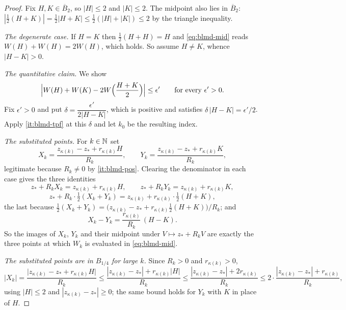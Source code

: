 \begin{proof}
Fix $H,K\in\overline B_2$, so $|H|\le2$ and $|K|\le2$. The midpoint also lies
in $\overline B_2$: $|\tfrac12(H+K)|=\tfrac12|H+K|\le\tfrac12(|H|+|K|)\le2$ by
the triangle inequality.

\emph{The degenerate case.} If $H=K$ then $\tfrac12(H+H)=H$ and
\eqref{eq:blmd-mid} reads $W(H)+W(H)=2W(H)$, which holds. So assume $H\ne K$,
whence $|H-K|>0$.

\emph{The quantitative claim.} We show
\begin{equation}\label{eq:blmd-bound}
  \Bigl|W(H)+W(K)-2W\Bigl(\frac{H+K}{2}\Bigr)\Bigr|\le\epsilon'
  \qquad\text{for every }\epsilon'>0 .
\end{equation}
Fix $\epsilon'>0$ and put $\delta=\dfrac{\epsilon'}{2|H-K|}$, which is positive
and satisfies $\delta\,|H-K|=\epsilon'/2$. Apply \ref{it:blmd-tpf} at this
$\delta$ and let $k_0$ be the resulting index.

\emph{The substituted points.} For $k\in\mathbb{N}$ set
\[
  X_k=\frac{z_{\kappa(k)}-z_*+r_{\kappa(k)}H}{R_k},\qquad
  Y_k=\frac{z_{\kappa(k)}-z_*+r_{\kappa(k)}K}{R_k},
\]
legitimate because $R_k\ne0$ by \ref{it:blmd-pos}. Clearing the denominator in
each case gives the three identities
\begin{equation}\label{eq:blmd-img}
  z_*+R_kX_k=z_{\kappa(k)}+r_{\kappa(k)}H,\qquad
  z_*+R_kY_k=z_{\kappa(k)}+r_{\kappa(k)}K,
\end{equation}
\[
  z_*+R_k\cdot\tfrac12(X_k+Y_k)
   =z_{\kappa(k)}+r_{\kappa(k)}\cdot\tfrac12(H+K),
\]
the last because $\tfrac12(X_k+Y_k)
=\bigl(z_{\kappa(k)}-z_*+r_{\kappa(k)}\tfrac12(H+K)\bigr)/R_k$; and
\begin{equation}\label{eq:blmd-diff}
  X_k-Y_k=\frac{r_{\kappa(k)}}{R_k}\,(H-K).
\end{equation}
So the images of $X_k$, $Y_k$ and their midpoint under $V\mapsto z_*+R_kV$ are
exactly the three points at which $W_k$ is evaluated in \eqref{eq:blmd-mid}.

\emph{The substituted points are in $B_{1/4}$ for large $k$.} Since
$R_k>0$ and $r_{\kappa(k)}>0$,
\[
  |X_k|=\frac{\bigl|z_{\kappa(k)}-z_*+r_{\kappa(k)}H\bigr|}{R_k}
   \le\frac{|z_{\kappa(k)}-z_*|+r_{\kappa(k)}|H|}{R_k}
   \le\frac{|z_{\kappa(k)}-z_*|+2r_{\kappa(k)}}{R_k}
   \le2\cdot\frac{|z_{\kappa(k)}-z_*|+r_{\kappa(k)}}{R_k},
\]
using $|H|\le2$ and $|z_{\kappa(k)}-z_*|\ge0$; the same bound holds for $Y_k$
with $K$ in place of $H$.


\end{proof}
